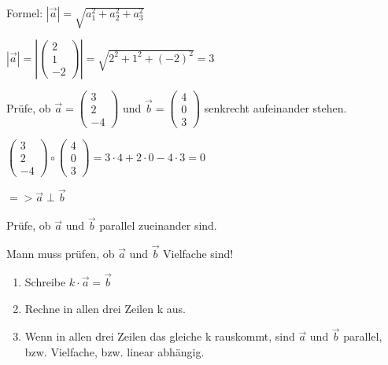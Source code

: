 \documentclass[paper=a6,landscape,ngerman,twoside=true,fontsize=12pt]{scrartcl}
\begin{document}
\begin{antwort}
	Formel: $\left|\vec{a}\right|=\sqrt{a_1^2 + a_2^2 + a_3^2}$
	
	\bigskip		
$\left|\vec{a}\right|=\left|\left(\begin{array}{c} 2 \\ 1 \\ -2\end{array} \right)\right|=\sqrt{2^2 + 1^2 + (-2)^2}=3$
	
\end{antwort}	
\begin{frage}
	\LARGE
	Prüfe, ob $\vec{a}=\left(\begin{array}{c} 3 \\ 2 \\ -4\end{array} \right)$ und  $\vec{b}=\left(\begin{array}{c} 4 \\ 0 \\ 3\end{array} \right)$ 
	senkrecht aufeinander stehen.
\end{frage}
\begin{antwort}
	
	$\left(\begin{array}{c} 3 \\ 2 \\ -4\end{array} \right) \circ \left(\begin{array}{c} 4 \\ 0 \\ 3\end{array} \right)= 3 \cdot 4 + 2 \cdot 0 -4\cdot 3=0$
	
	$=> \vec{a} \perp \vec{b}$
	
\end{antwort}	
\begin{frage}
	\LARGE
	Prüfe, ob $\vec{a}$ und  $\vec{b}$ 
	parallel zueinander sind.
\end{frage}
\begin{antwort}
	
	Mann muss prüfen, ob $\vec{a}$ und  $\vec{b}$ Vielfache sind!
	\begin{enumerate}
		\item Schreibe $k \cdot \vec{a}= \vec{b}$
		\item Rechne in allen drei Zeilen k aus.			
		\item Wenn in allen drei Zeilen das gleiche k rauskommt, sind $\vec{a}$ und $\vec{b}$
		parallel, bzw. Vielfache, bzw. linear abhängig.	
	\end{enumerate}	
	
\end{antwort}	
\end{document}
